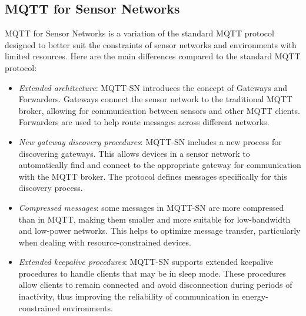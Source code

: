 \subsection{MQTT for Sensor Networks}
MQTT for Sensor Networks is a variation of the standard MQTT protocol designed to better suit the constraints of sensor networks and environments with limited resources. 
Here are the main differences compared to the standard MQTT protocol:
\begin{itemize}
    \item \textit{Extended architecture}: MQTT-SN introduces the concept of Gateways and Forwarders. 
        Gateways connect the sensor network to the traditional MQTT broker, allowing for communication between sensors and other MQTT clients. 
        Forwarders are used to help route messages across different networks.
    \item \textit{New gateway discovery procedures}: MQTT-SN includes a new process for discovering gateways. 
        This allows devices in a sensor network to automatically find and connect to the appropriate gateway for communication with the MQTT broker.
            The protocol defines messages specifically for this discovery process.
    \item \textit{Compressed messages}: some messages in MQTT-SN are more compressed than in MQTT, making them smaller and more suitable for low-bandwidth and low-power networks. 
        This helps to optimize message transfer, particularly when dealing with resource-constrained devices.
    \item \textit{Extended keepalive procedures}: MQTT-SN supports extended keepalive procedures to handle clients that may be in sleep mode. 
        These procedures allow clients to remain connected and avoid disconnection during periods of inactivity, thus improving the reliability of communication in energy-constrained environments.
\end{itemize}